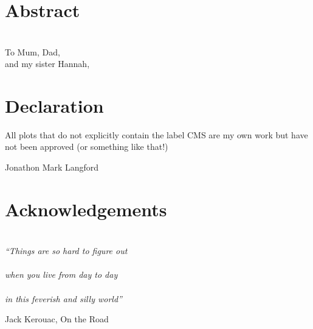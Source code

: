 \chapter*{\centering Abstract}


\chapter*{\centering }%
\begin{center}
    \thispagestyle{empty}
    To Mum, Dad,\\ and my sister Hannah,
\end{center}


\chapter*{\centering Declaration}
All plots that do not explicitly contain the label CMS are my own work but have not been approved (or something like that!)


\begin{flushright}
    Jonathon Mark Langford
\end{flushright}


\chapter*{\centering Acknowledgements}

\tableofcontents
\listoffigures
\listoftables

\chapter*{}
\epigraph{
  \textit{``Things are so hard to figure out \\ \\
            when you live from day to day \\ \\
            in this feverish and silly world''}}
          {Jack Kerouac, On the Road}

\cleardoublepage
